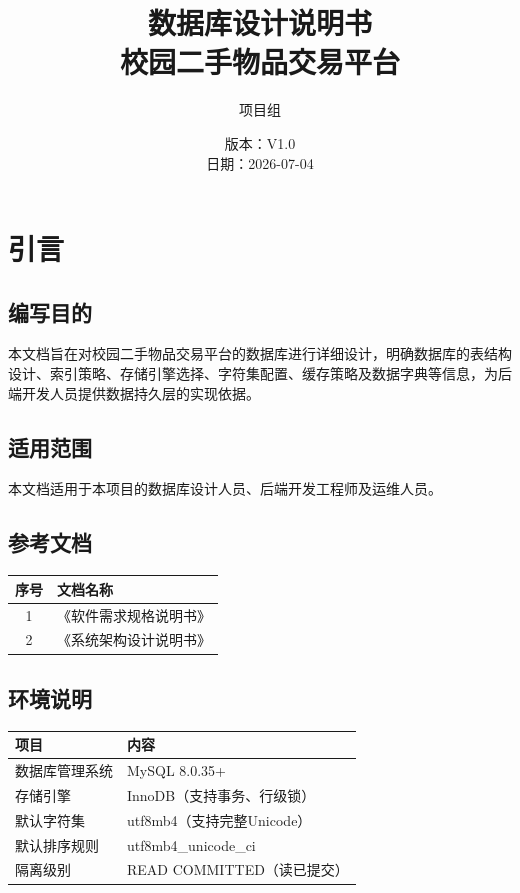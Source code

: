 \documentclass[12pt,a4paper,UTF8]{ctexart}
\title{\textbf{\Huge 数据库设计说明书}\\[8pt]
       \normalsize 校园二手物品交易平台}
\author{项目组}
\date{版本：V1.0\\[4pt] 日期：2026-07-04}
\begin{document}
\maketitle
\thispagestyle{empty}
\newpage

\tableofcontents
\newpage

\section{引言}

\subsection{编写目的}

本文档旨在对校园二手物品交易平台的数据库进行详细设计，明确数据库的表结构设计、索引策略、存储引擎选择、字符集配置、缓存策略及数据字典等信息，为后端开发人员提供数据持久层的实现依据。

\subsection{适用范围}

本文档适用于本项目的数据库设计人员、后端开发工程师及运维人员。

\subsection{参考文档}

\begin{table}[H]
    \centering
    \begin{tabularx}{\textwidth}{|c|X|}
        \hline
        \textbf{序号} & \textbf{文档名称} \\
        \hline
        1 & 《软件需求规格说明书》 \\
        \hline
        2 & 《系统架构设计说明书》 \\
        \hline
    \end{tabularx}
\end{table}

\subsection{环境说明}

\begin{longtable}{p{}|p{}}
    \toprule
    \textbf{项目} & \textbf{内容} \\
    \midrule
    \endhead
    \bottomrule
    \endfoot

    数据库管理系统 & MySQL 8.0.35+ \\
    存储引擎 & InnoDB（支持事务、行级锁） \\
    默认字符集 & utf8mb4（支持完整Unicode） \\
    默认排序规则 & utf8mb4\_unicode\_ci \\
    隔离级别 & READ COMMITTED（读已提交） \\
\end{longtable}
\end{document}
